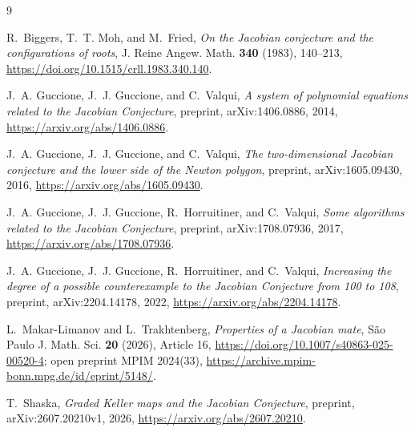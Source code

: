 \documentclass[11pt]{article}
\theoremstyle{definition}
\theoremstyle{remark}
\begin{document}
\begin{thebibliography}{9}

R.~Biggers, T.~T. Moh, and M.~Fried,
\emph{On the Jacobian conjecture and the configurations of roots},
J. Reine Angew. Math. \textbf{340} (1983), 140--213,
\url{https://doi.org/10.1515/crll.1983.340.140}.

J.~A. Guccione, J.~J. Guccione, and C.~Valqui,
\emph{A system of polynomial equations related to the Jacobian
Conjecture},
preprint, arXiv:1406.0886, 2014,
\url{https://arxiv.org/abs/1406.0886}.

J.~A. Guccione, J.~J. Guccione, and C.~Valqui,
\emph{The two-dimensional Jacobian conjecture and the lower side of the
Newton polygon},
preprint, arXiv:1605.09430, 2016,
\url{https://arxiv.org/abs/1605.09430}.

J.~A. Guccione, J.~J. Guccione, R.~Horruitiner, and C.~Valqui,
\emph{Some algorithms related to the Jacobian Conjecture},
preprint, arXiv:1708.07936, 2017,
\url{https://arxiv.org/abs/1708.07936}.

J.~A. Guccione, J.~J. Guccione, R.~Horruitiner, and C.~Valqui,
\emph{Increasing the degree of a possible counterexample to the
Jacobian Conjecture from 100 to 108},
preprint, arXiv:2204.14178, 2022,
\url{https://arxiv.org/abs/2204.14178}.

L.~Makar-Limanov and L.~Trakhtenberg,
\emph{Properties of a Jacobian mate},
S\~{a}o Paulo J. Math. Sci. \textbf{20} (2026), Article 16,
\url{https://doi.org/10.1007/s40863-025-00520-4};
open preprint MPIM 2024(33),
\url{https://archive.mpim-bonn.mpg.de/id/eprint/5148/}.

T.~Shaska,
\emph{Graded Keller maps and the Jacobian Conjecture},
preprint, arXiv:2607.20210v1, 2026,
\url{https://arxiv.org/abs/2607.20210}.

\end{thebibliography}
\end{document}
